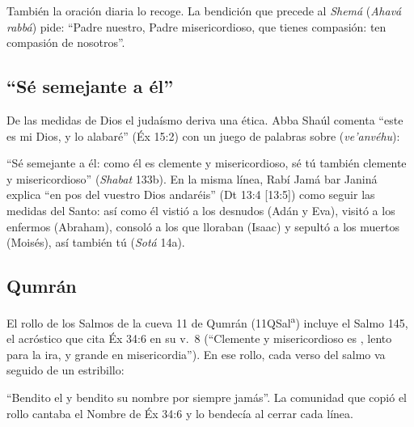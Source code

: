 También la oración diaria lo recoge. La bendición que precede al \emph{Shemá} (\emph{Ahavá rabbá}) pide:
\noindent ``Padre nuestro, Padre misericordioso, que tienes compasión: ten compasión de nosotros''.

\subsection{“Sé semejante a él”}
De las medidas de Dios el judaísmo deriva una ética. Abba Shaúl comenta ``este es mi Dios, y lo alabaré'' (Éx 15:2) con un juego de palabras sobre  (\emph{ve'anvéhu}):


``Sé semejante a él: como él es clemente y misericordioso, sé tú también clemente y misericordioso'' (\emph{Shabat} 133b). En la misma línea, Rabí Jamá bar Janiná explica ``en pos del \SENOR{} vuestro Dios andaréis'' (Dt 13:4 [13:5]) como seguir las medidas del Santo: así como él vistió a los desnudos (Adán y Eva), visitó a los enfermos (Abraham), consoló a los que lloraban (Isaac) y sepultó a los muertos (Moisés), así también tú (\emph{Sotá} 14a).


\subsection{Qumrán}
El rollo de los Salmos de la cueva 11 de Qumrán (11QSal\textsuperscript{a}) incluye el Salmo 145, el acróstico que cita Éx 34:6 en su v.~8 (``Clemente y misericordioso es \SENOR, lento para la ira, y grande en misericordia''). En ese rollo, cada verso del salmo va seguido de un estribillo:


``Bendito el \SENOR{} y bendito su nombre por siempre jamás''. La comunidad que copió el rollo cantaba el Nombre de Éx 34:6 y lo bendecía al cerrar cada línea.


